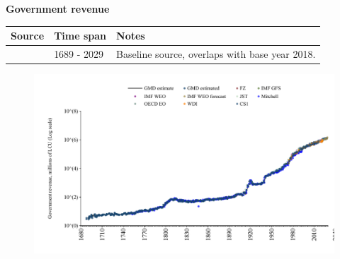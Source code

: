 \documentclass[12pt,a4paper,landscape]{article}
\begin{document}
\begin{adjustbox}{max totalsize={\paperwidth}{\paperheight},center}
\begin{minipage}[t][\textheight][t]{\textwidth}
\vspace*{0.5cm}
{}
\begin{center}
{\Large\bfseries Government revenue}
\end{center}
\vspace{0.5cm}
\begin{table}[H]
\centering
\small
\begin{tabular}{|l|l|l|}
\hline
\textbf{Source} & \textbf{Time span} & \textbf{Notes} \\
\hline
\rowcolor{white}\cite{GMD_estimated}& 1689 - 2029 &Baseline source, overlaps with base year 2018. \\
\hline
\end{tabular}
\end{table}
\begin{figure}[H]
\centering
\includegraphics[width=\textwidth,height=0.6\textheight,keepaspectratio]{graphs/GBR_govrev.pdf}
\end{figure}
\end{minipage}
\end{adjustbox}
\end{document}
